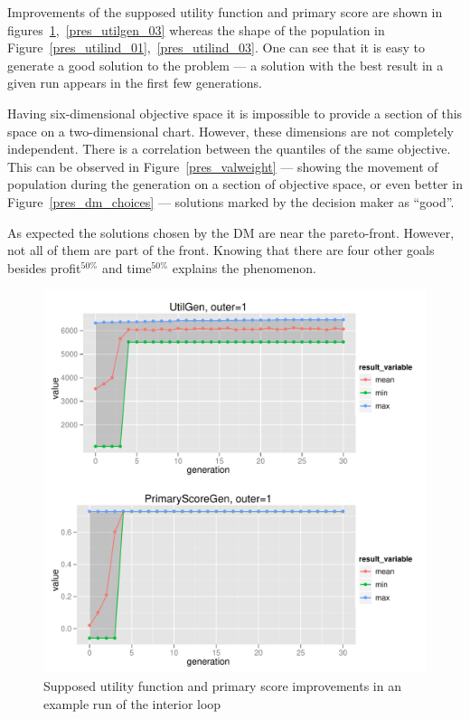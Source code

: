 Improvements of the supposed utility function and primary score are shown in
figures~\ref{pres_utilgen_01},~\ref{pres_utilgen_03} whereas the shape of the
population in Figure~\ref{pres_utilind_01},~\ref{pres_utilind_03}. One can see
that it is easy to generate a good solution to the problem --- a solution with
the best result in a given run appears in the first few generations.

Having six-dimensional objective space it is impossible to provide a section
of this space on a two-dimensional chart. However, these dimensions are not
completely independent. There is a correlation between the quantiles of the
same objective. This can be observed in Figure~\ref{pres_valweight} --- showing
the movement of population during the generation on a section of objective
space, or even better in Figure~\ref{pres_dm_choices} --- solutions marked by the
decision maker as ``good''.

As expected the solutions chosen by the DM are near the pareto-front. However,
not all of them are part of the front. Knowing that there are four other goals
besides profit$^{50\%}$ and time$^{50\%}$ explains the phenomenon.

\begin{figure}
  \centering
  \includegraphics[width=1\textwidth]{exp/uncert/pres_utilgen_01}
  \caption{Supposed utility function and primary score improvements in an
    example run of the interior loop}
  \label{pres_utilgen_01}
\end{figure}


